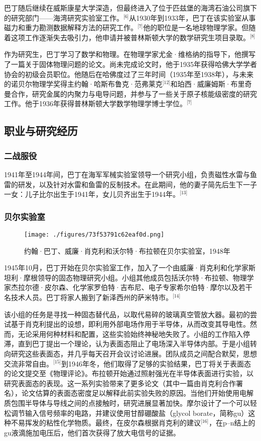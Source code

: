 巴丁随后继续在威斯康星大学深造，但最终进入了位于匹兹堡的海湾石油公司旗下的研究部门——海湾研究实验室工作。\(^\text{[6]}\)从1930年到1933年，巴丁在该实验室从事磁力和重力勘测数据解释方法的研究工作。\(^\text{[7]}\)他的职位是一名地球物理学家。但随着这项工作逐渐失去吸引力，他申请并被普林斯顿大学的数学研究生项目录取。\(^\text{[8]}\)

作为研究生，巴丁学习了数学和物理。在物理学家尤金·维格纳的指导下，他撰写了一篇关于固体物理问题的论文。尚未完成论文时，他于1935年获得哈佛大学学者协会的初级会员职位。他随后在哈佛度过了三年时间（1935年至1938年），与未来的诺贝尔物理学奖得主约翰·哈斯布鲁克·范弗莱克\(^\text{[12]}\)和珀西·威廉姆斯·布里奇曼合作，研究金属的内聚力与电导问题，并参与了一些关于原子核能级密度的研究工作。他于1936年获得普林斯顿大学数学物理学博士学位。\(^\text{[7]}\)
\subsection{职业与研究经历}
\subsubsection{二战服役}
1941年至1944年间，巴丁在海军军械实验室领导一个研究小组，负责磁性水雷与鱼雷的研发，以及针对水雷和鱼雷的反制技术。在此期间，他的妻子简先后生下一子一女：儿子比尔出生于1941年，女儿贝齐出生于1944年。\(^\text{[13]}\)
\subsubsection{贝尔实验室}
\begin{figure}[ht]
\centering
\texttt{[image: ./figures/73f53791c62eaf0d.png]}
\caption{约翰·巴丁、威廉·肖克利和沃尔特·布拉顿在贝尔实验室，1948年} \label{fig_Yhbd_2}
\end{figure}
1945年10月，巴丁开始在贝尔实验室工作，加入了一个由威廉·肖克利和化学家斯坦利·摩根领导的固态物理研究小组。小组其他成员包括沃尔特·布拉顿、物理学家杰拉尔德·皮尔森、化学家罗伯特·吉布尼、电子专家希尔伯特·摩尔以及若干名技术人员。巴丁将家人搬到了新泽西州的萨米特市。\(^\text{[14]}\)

该小组的任务是寻找一种固态替代品，以取代易碎的玻璃真空管放大器。最初的尝试基于肖克利提出的设想，即利用外部电场作用于半导体，从而改变其导电性。然而，无论采用何种材料和配置，这些实验始终神秘地失败了。小组的工作陷入停滞，直到巴丁提出一个理论，认为表面态阻止了电场深入半导体内部。于是小组转向研究这些表面态，并几乎每天召开会议讨论进展。团队成员之间配合默契，思想交流非常自由。\(^\text{[15]}\)到1946年冬，他们取得了足够的实验结果，巴丁将关于表面态的论文提交至《物理评论》。布拉顿开始通过照射强光在半导体表面进行实验，以研究表面态的表现。这一系列实验带来了更多论文（其中一篇由肖克利合作署名），论文估算的表面态密度足以解释此前实验失败的原因。当他们开始使用电解质包围半导体与导线之间的点接触时，研究进展显著加快。摩尔设计了一个可以轻松调节输入信号频率的电路，并建议使用甘醇硼酸盐（glycol borate，简称gu）这种不易挥发的粘性化学物质。最终，在皮尔森根据肖克利的建议\(^\text{[16]}\)，在p–n结上的gu液滴施加电压后，他们首次获得了放大电信号的证据。
